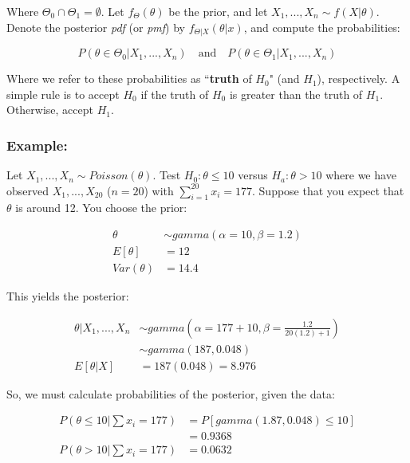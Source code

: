 \documentclass{article}
\begin{document}
    \noindent Where $\Theta_0 \cap \Theta_1 = \emptyset$. Let $f_\Theta(\theta)$ be the prior, and let $X_1,...,X_n \sim f(X|\theta)$. Denote the posterior \textit{pdf} (or \textit{pmf}) by $f_{\Theta|X} (\theta|x)$, and compute the probabilities:
    
    \begin{equation*}
        P(\theta \in \Theta_0 | X_1,...,X_n) \quad  \text{and} \quad P(\theta \in \Theta_1 | X_1,...,X_n) 
    \end{equation*}
    
    \noindent Where we refer to these probabilities as ``\textbf{truth} of $H_0$" (and $H_1$), respectively. A simple rule is to accept $H_0$ if the truth of $H_0$ is greater than the truth of $H_1$. Otherwise, accept $H_1$.

    \subsubsection*{Example:}
    
    Let $X_1,...,X_n \sim Poisson(\theta)$. Test $H_0: \theta \leq 10$ versus $H_a: \theta > 10$ where we have observed $X_1,...,X_{20}$ ($n=20$) with $\sum_{i=1}^{20} x_i = 177$. Suppose that you expect that $\theta$ is around 12. You choose the prior:
    
    \begin{equation*}
    \begin{split}
        \theta &\sim gamma(\alpha = 10, \beta = 1.2)\\
        E[\theta] &= 12\\
        Var(\theta) &= 14.4
    \end{split}
    \end{equation*}

    This yields the posterior:
    
    \begin{equation*}
        \begin{split}
            \theta|X_1,...,X_n &\sim gamma\left(\alpha=177+10,\beta = \frac{1.2}{20(1.2) + 1}\right)\\
                &\sim gamma(187,0.048)\\
                E[\theta|X] &= 187(0.048) = 8.976
        \end{split}
    \end{equation*}
    
    So, we must calculate probabilities of the posterior, given the data:
    
    \begin{equation*}
        \begin{split}
            P\left(\theta \leq 10 | \sum x_i = 177\right) &= P[gamma(1.87,0.048) \leq 10]\\
            &= 0.9368\\
            P\left( \theta > 10 | \sum x_i = 177 \right) &= 0.0632
        \end{split}
    \end{equation*}
    
\end{document}
